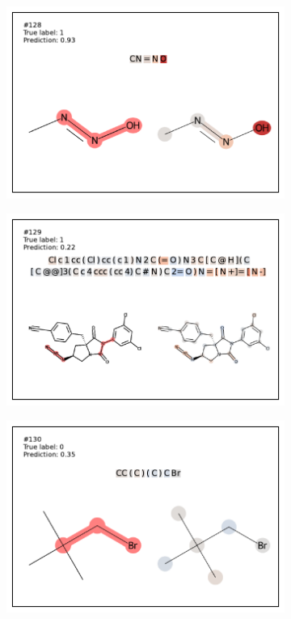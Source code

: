 \begin{figure}
\begin{subfigure}[b]{0.33\textwidth}
\end{subfigure} 
\begin{subfigure}[b]{0.33\textwidth} 
  \centering 
  \includegraphics[width=\textwidth]{figures/ames/ames128.pdf} 
\end{subfigure}\begin{subfigure}[b]{0.33\textwidth} 
  \centering 
  \includegraphics[width=\textwidth]{figures/ames/ames129.pdf} 
\end{subfigure}\begin{subfigure}[b]{0.33\textwidth} 
  \centering 
  \includegraphics[width=\textwidth]{figures/ames/ames130.pdf} 

\end{subfigure}
\end{figure}
